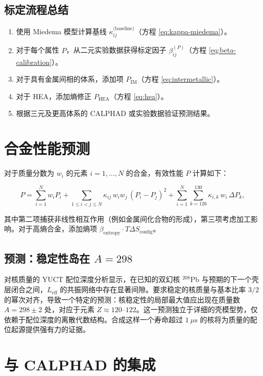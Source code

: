 \documentclass[12pt,a4paper]{article}
\begin{document}
	\subsection{标定流程总结}
	
	\begin{enumerate}
		\item 使用 Miedema 模型计算基线 \(\kappa_{ij}^{\text{(baseline)}}\)（方程 \ref{eq:kappa-miedema}）。
		\item 对于每个属性 \(P\)，从二元实验数据获得标定因子 \(\beta_{ij}^{(P)}\)（方程 \ref{eq:beta-calibration}）。
		\item 对于具有金属间相的体系，添加项 \(P_{\text{IM}}\)（方程 \ref{eq:intermetallic}）。
		\item 对于 HEA，添加熵修正 \(P_{\text{HEA}}\)（方程 \ref{eq:hea}）。
		\item 根据三元及更高体系的 CALPHAD 或实验数据验证预测结果。
	\end{enumerate}
	
	\section{合金性能预测}
	
	对于质量分数为 \(w_i\) 的元素 \(i = 1,\dots,N\) 的合金，有效性能 \(P\) 计算如下：
	
	\[
	P = \sum_{i=1}^{N} w_i P_i
	+ \sum_{1\le i<j\le N} \kappa_{ij}\, w_i w_j\, (P_i - P_j)^2
	+ \sum_{i=1}^{N} \sum_{k=126}^{130} \kappa_{i,k}\, w_i\, \Delta P_k,
	\]
	
	其中第二项捕获非线性相互作用（例如金属间化合物的形成），第三项考虑加工影响。对于高熵合金，添加熵项 \(\beta_{\text{entropy}} \cdot T \Delta S_{\text{config}}\)。
	
	\subsection{预测：稳定性岛在 \(A=298\)}
	
	对核质量的 YUCT 配位深度分析显示，在已知的双幻核 \(^{208}\mathrm{Pb}\) 与预期的下一个壳层闭合之间，\(L_{\mathrm{eff}}\) 的共振网络中存在显著间隙。要求稳定的核质量与基本比率 \(3/2\) 的幂次对齐，导致一个特定的预测：核稳定性的局部最大值应出现在质量数 \(A = 298 \pm 2\) 处，对应于元素 \(Z \approx 120\)–\(122\)。这一预测独立于详细的壳模型势，仅依赖于配位深度的离散代数结构。合成这样一个寿命超过 \(1\ \mu\text{s}\) 的核将为质量的配位起源提供强有力的证据。
	
	\section{与 CALPHAD 的集成}
	
\end{document}
